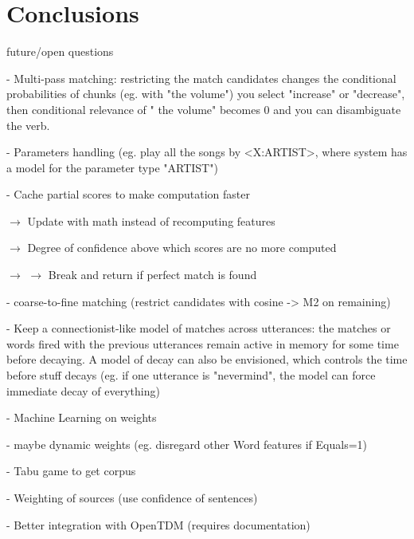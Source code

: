
\chapter{Conclusions} %

\label{ch:conclusions} %



future/open questions

- Multi-pass matching: restricting the match candidates changes the
   conditional probabilities of chunks (eg. with "the volume") you select
   "increase" or "decrease", then conditional relevance of " the volume" becomes
   0 and you can disambiguate the verb.
   
- Parameters handling (eg. play all the songs by <X:ARTIST>, where system has a
  model for the parameter type "ARTIST")

- Cache partial scores to make computation faster
 
   $\rightarrow$ Update with math instead of recomputing features
   
   $\rightarrow$ Degree of confidence above which scores are no more computed
   
   $\rightarrow$ $\rightarrow$ Break and return if perfect match is found
   
- coarse-to-fine matching (restrict candidates with cosine -> M2 on remaining)
 
- Keep a connectionist-like model of matches across utterances: the matches or 
  words fired with the previous utterances remain active in memory for some 
  time before decaying. A model of decay can also be envisioned, which controls
  the time before stuff decays (eg. if one utterance is "nevermind", the model
  can force immediate decay of everything)
 
- Machine Learning on weights
 
- maybe dynamic weights (eg. disregard other Word features if Equals=1)
 
- Tabu game to get corpus
 
- Weighting of sources (use confidence of sentences)
 
- Better integration with OpenTDM (requires documentation)
 
